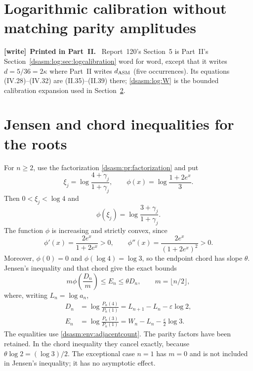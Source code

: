 \documentclass[11pt,letterpaper]{article}
\theoremstyle{remark}\newtheorem{remark}[theorem]{Remark}
\newcommand{\eps}{\varepsilon}\newcommand{\HH}{\mathcal H}\newcommand{\one}{\mathbf1}
\newenvironment{writenote}[1][]{\par\smallskip\begingroup\small
 \noindent\textbf{[write]}\if\relax\detokenize{#1}\relax\else~\textbf{#1.}\fi\ }%
 {\par\endgroup\smallskip}
\begin{document}
\section{Logarithmic calibration without matching parity amplitudes}
\label{dsasm:env:sec:logcalibration}
\begin{writenote}[Printed in Part~II]
Report~120's Section~5 is Part~II's Section~\ref{dsasm:log:sec:logcalibration} word for word, except that it writes $d=5/36=2\kappa$ where Part~II writes $d_{\rm ASM}$ (five occurrences). Its equations (IV.28)--(IV.32) are (II.35)--(II.39) there; \eqref{dsasm:log:W} is the bounded calibration expansion used in Section~\ref{dsasm:env:sec:jensen}.
\end{writenote}
\setcounter{equation}{32}
\section{Jensen and chord inequalities for the roots}
\label{dsasm:env:sec:jensen}
For $n\ge2$, use the factorization \eqref{dsasm:pr:factorization} and put
\begin{equation}\label{dsasm:env:xi}
 \xi_j=\log\frac{4+\gamma_j}{1+\gamma_j},\qquad
 \phi(x)=\log\frac{1+2e^x}{3}.
\end{equation}
Then $0<\xi_j<\log4$ and
\[
 \phi(\xi_j)=\log\frac{3+\gamma_j}{1+\gamma_j}.
\]
The function $\phi$ is increasing and strictly convex, since
\[
 \phi'(x)=\frac{2e^x}{1+2e^x}>0,\qquad
 \phi''(x)=\frac{2e^x}{(1+2e^x)^2}>0.
\]
Moreover, $\phi(0)=0$ and $\phi(\log4)=\log3$, so the endpoint chord
has slope $\theta$. Jensen's inequality and that chord give the exact
bounds
\begin{equation}\label{dsasm:env:Jensen}
 m\phi\left(\frac{D_n}{m}\right)\le E_n\le\theta D_n,
 \qquad m=\lfloor n/2\rfloor,
\end{equation}
where, writing $L_n=\log a_n$,
\begin{equation}\label{dsasm:env:DE}
\begin{split}
 D_n&=\log\frac{P_n(4)}{P_n(1)}
       =L_{n+1}-L_n-\eps\log2,\\
 E_n&=\log\frac{P_n(3)}{P_n(1)}
       =W_n-L_n-\frac\eps2\log3.
\end{split}
\end{equation}
The equalities use \eqref{dsasm:env:adjacentcount}. The parity factors have been
retained. In the chord inequality they cancel exactly, because
$\theta\log2=(\log3)/2$. The exceptional case $n=1$ has $m=0$ and
is not included in Jensen's inequality; it has no asymptotic effect.
\end{document}
